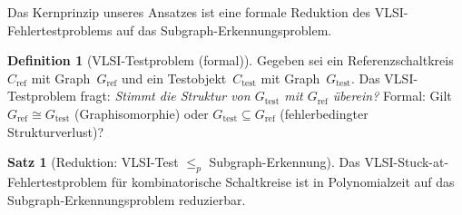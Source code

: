 ﻿\documentclass[a4paper,12pt]{article}
\theoremstyle{definition}
\newtheorem{definition}{Definition}
\newtheorem{satz}{Satz}
\begin{document}
Das Kernprinzip unseres Ansatzes ist eine formale Reduktion des
VLSI-Fehlertestproblems auf das Subgraph-Erkennungsproblem.

\begin{definition}[VLSI-Testproblem (formal)]
  Gegeben sei ein Referenzschaltkreis~$C_{\mathrm{ref}}$ mit
  Graph~$G_{\mathrm{ref}}$ und ein Testobjekt~$C_{\mathrm{test}}$ mit
  Graph~$G_{\mathrm{test}}$.
  Das VLSI-Testproblem fragt:
  \emph{Stimmt die Struktur von $G_{\mathrm{test}}$ mit
  $G_{\mathrm{ref}}$ überein?}
  Formal: Gilt $G_{\mathrm{ref}} \cong G_{\mathrm{test}}$
  (Graphisomorphie) oder $G_{\mathrm{test}} \subseteq G_{\mathrm{ref}}$
  (fehlerbedingter Strukturverlust)?
\end{definition}

\begin{satz}[Reduktion: VLSI-Test $\leq_p$ Subgraph-Erkennung]
  \label{satz:reduktion}\sloppy
  Das VLSI-Stuck-at-Fehlertestproblem für kombinatorische Schaltkreise
  ist in Polynomialzeit auf das Subgraph-Erkennungs\-problem reduzierbar.
\end{satz}
\end{document}
